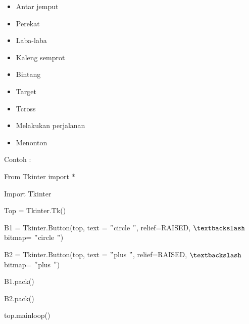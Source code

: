 \documentclass{wileySix}
\begin{document}
\begin{myEnumerate}
\begin{myEnumerate}
{\begin{myEnumerate}
\begin{itemize}
		\noindent 
		\item Antar jemput \par
		\noindent 
		\item Perekat \par
		\noindent 
		\item Laba-laba \par
		\noindent 
		\item Kaleng semprot \par
		\noindent 
		\item Bintang \par
		\noindent 
		\item Target \par
		\noindent 
		\item Tcross \par
		\noindent 
		\item Melakukan perjalanan \par
		\noindent 
		\item Menonton\end{itemize}
	\par
	\vspace{12pt}
	Contoh : \par
	{\fontsize{10pt}{10pt}\selectfont From Tkinter import *} \par
	{\fontsize{10pt}{10pt}\selectfont Import Tkinter} \par
	\vspace{10pt}
	{\fontsize{10pt}{10pt}\selectfont Top = Tkinter.Tk()} \par
	\vspace{10pt}
	{\fontsize{10pt}{10pt}\selectfont B1 = Tkinter.Button(top, text = $ " $circle $ " $, relief=RAISED,  $  \textbackslash  $ bitmap= $ " $circle $ " $)} \par
	{\fontsize{10pt}{10pt}\selectfont B2 = Tkinter.Button(top, text = $ " $plus $ " $, relief=RAISED,  $  \textbackslash  $ bitmap= $ " $plus $ " $)} \par
	\vspace{10pt}
	{\fontsize{10pt}{10pt}\selectfont B1.pack()} \par
	{\fontsize{10pt}{10pt}\selectfont B2.pack()} \par
	{\fontsize{10pt}{10pt}\selectfont top.mainloop()} \par
	\vspace{10pt}
	\noindent 


\end{myEnumerate}}
\end{myEnumerate}
\end{myEnumerate}
\end{document}
